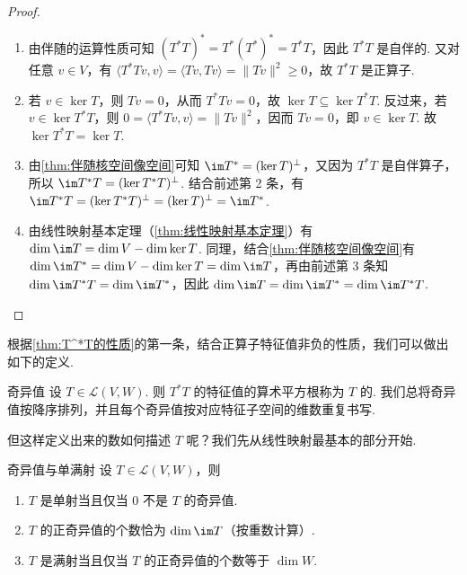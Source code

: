 \begin{proof}
    \begin{enumerate}
        \item 由伴随的运算性质可知 $(T^*T)^* = T^*(T^*)^* = T^*T$，因此 $T^*T$ 是自伴的. 又对任意 $v \in V$，有 $\langle T^*Tv, v \rangle = \langle Tv, Tv \rangle = \lVert Tv \rVert^2 \geqslant 0$，故 $T^*T$ 是正算子.

        \item 若 $v \in \ker T$，则 $Tv = 0$，从而 $T^*Tv = 0$，故 $\ker T \subseteq \ker T^*T$. 反过来，若 $v \in \ker T^*T$，则 $0 = \langle T^*Tv, v \rangle = \lVert Tv \rVert^2$，因而 $Tv = 0$，即 $v \in \ker T$. 故 $\ker T^*T = \ker T$.

        \item 由\autoref{thm:伴随核空间像空间}可知 $\im T^* = (\ker T)^{\perp}$，又因为 $T^*T$ 是自伴算子，所以 $\im T^*T = (\ker T^*T)^{\perp}$. 结合前述第 2 条，有 $\im T^*T = (\ker T^*T)^{\perp} = (\ker T)^{\perp} = \im T^*$.

        \item 由线性映射基本定理（\autoref{thm:线性映射基本定理}）有 $\dim \im T = \dim V - \dim \ker T$. 同理，结合\autoref{thm:伴随核空间像空间}有 $\dim \im T^* = \dim V - \dim \ker T = \dim \im T$，再由前述第 3 条知 $\dim \im T^*T = \dim \im T^*$，因此 $\dim \im T = \dim \im T^* = \dim \im T^*T$.
    \end{enumerate}
\end{proof}

根据\autoref{thm:T^*T的性质}的第一条，结合正算子特征值非负的性质，我们可以做出如下的定义.

\begin{definition}{奇异值}{} 
    设 $T \in \mathcal{L}(V, W)$. 则 $T^*T$ 的特征值的算术平方根称为 $T$ 的. 我们总将奇异值按降序排列，并且每个奇异值按对应特征子空间的维数重复书写.
\end{definition}

但这样定义出来的数如何描述 $T$ 呢？我们先从线性映射最基本的部分开始.

\begin{theorem}{}{奇异值与单满射}
    设 $T \in \mathcal{L}(V, W)$，则
    \begin{enumerate}
        \item $T$ 是单射当且仅当 $0$ 不是 $T$ 的奇异值.

        \item $T$ 的正奇异值的个数恰为 $\dim \im T$（按重数计算）.

        \item $T$ 是满射当且仅当 $T$ 的正奇异值的个数等于 $\dim W$.
    \end{enumerate}
\end{theorem}

